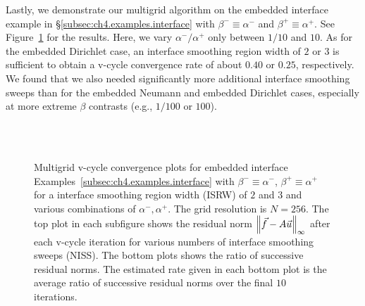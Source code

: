 Lastly, we demonstrate our multigrid algorithm on the embedded interface example in \S\ref{subsec:ch4.examples.interface} with $\beta^- \equiv \alpha^-$ and $\beta^+ \equiv \alpha^+$. See Figure~\ref{fig:ch4.examples.multigrid.interface} for the results. Here, we vary $\alpha^- / \alpha^+$ only between $1/10$ and $10$. As for the embedded Dirichlet case, an interface smoothing region width of $2$ or $3$ is sufficient to obtain a v-cycle convergence rate of about $0.40$ or $0.25$, respectively. We found that we also needed significantly more additional interface smoothing sweeps than for the embedded Neumann and embedded Dirichlet cases, especially at more extreme $\beta$ contrasts (e.g., $1/100$ or $100$).

\setlength{\figurewidth}{0.33\textwidth}
\begin{figure}[htbp]
\centering
{}
 \\
 \\
\caption{Multigrid v-cycle convergence plots for embedded interface Examples~\ref{subsec:ch4.examples.interface} with $\beta^- \equiv \alpha^-$, $\beta^+ \equiv \alpha^+$ for a interface smoothing region width (ISRW) of $2$ and $3$ and various combinations of $\alpha^-, \alpha^+$. The grid resolution is $N = 256$. The top plot in each subfigure shows the residual norm $\left\lVert  \vec{f} - A\vec{u}  \right\rVert_{\infty}$ after each v-cycle iteration for various numbers of interface smoothing sweeps (NISS). The bottom plots shows the ratio of successive residual norms. The estimated rate given in each bottom plot is the average ratio of successive residual norms over the final $10$ iterations.}
\label{fig:ch4.examples.multigrid.interface}
\end{figure}

